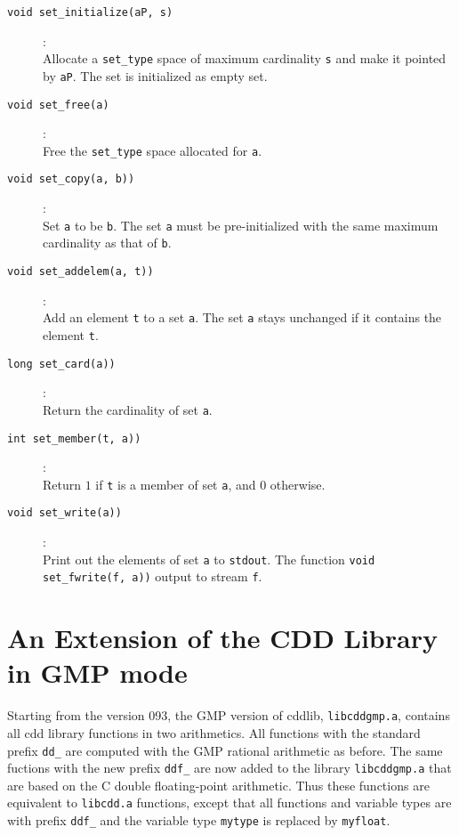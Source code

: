 \documentclass[11pt]{article}
\newcommand {\0} {{\bf 0}}
\begin{document}
\begin{description}

\item[{\tt void set\_initialize(aP, s)}]:\\
Allocate a {\tt set\_type} space of maximum cardinality {\tt s}
 and make it pointed by {\tt aP}.  The set is initialized as empty set.

\item[{\tt void set\_free(a)}]:\\
Free the  {\tt set\_type} space allocated for {\tt a}.

\item[{\tt void set\_copy(a, b))}]:\\
Set {\tt a} to be {\tt b}.   The set {\tt a} must be pre-initialized
with the same maximum cardinality as that of {\tt b}.

\item[{\tt void set\_addelem(a, t))}]:\\
Add an element  {\tt t} to a set {\tt a}.    The set  {\tt a} stays unchanged
if it contains the element {\tt t}.

\item[{\tt long set\_card(a))}]:\\
Return the cardinality of set {\tt a}.

\item[{\tt int set\_member(t, a))}]:\\
Return $1$ if  {\tt t} is a member of set {\tt a}, and $0$ otherwise.


\item[{\tt void set\_write(a))}]:\\
Print out the elements of set {\tt a} to {\tt stdout}.  The function {\tt void set\_fwrite(f, a))} output
to stream {\tt f}.

\end{description}

\section{An Extension of the CDD Library in GMP mode}  \label{GMPLIB}

Starting from the version 093, the GMP version of cddlib, {\tt libcddgmp.a}, contains
all cdd library functions in two arithmetics.   All functions with the standard prefix {\tt dd\_}
are computed with the GMP rational arithmetic as before.  The same fuctions with
the new prefix {\tt ddf\_} are now added to the library  {\tt libcddgmp.a} that are based
on the C  double floating-point arithmetic.  Thus these functions are equivalent to
 {\tt libcdd.a} functions, except that all functions and  variable types are with prefix  {\tt ddf\_} and
the variable type {\tt mytype} is replaced by {\tt myfloat}.
\end{document}
